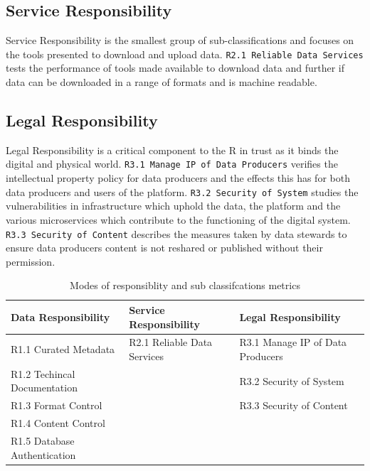 \documentclass{article}
\begin{document}
\hypertarget{service-responsibility}{%
\subsection{Service Responsibility}\label{service-responsibility}}

Service Responsibility is the smallest group of sub-classifications and
focuses on the tools presented to download and upload data.
\texttt{R2.1\ Reliable\ Data\ Services} tests the performance of tools
made available to download data and further if data can be downloaded in
a range of formats and is machine readable.

\hypertarget{legal-responsibility}{%
\subsection{Legal Responsibility}\label{legal-responsibility}}

Legal Responsibility is a critical component to the R in trust as it
binds the digital and physical world.
\texttt{R3.1\ Manage\ IP\ of\ Data\ Producers} verifies the intellectual
property policy for data producers and the effects this has for both
data producers and users of the platform.
\texttt{R3.2\ Security\ of\ System} studies the vulnerabilities in
infrastructure which uphold the data, the platform and the various
microservices which contribute to the functioning of the digital system.
\texttt{R3.3\ Security\ of\ Content} describes the measures taken by
data stewards to ensure data producers content is not reshared or
published without their permission.

\begin{table}[H]

\caption{\label{tab:fig1}Modes of responsiblity and sub classifcations metrics}
\centering
\begin{tabular}[t]{l|l|l}
\hline
Data Responsibility & Service Responsibility & Legal Responsibility\\
\hline
R1.1 Curated Metadata & R2.1 Reliable Data Services & R3.1 Manage IP of Data Producers\\
\hline
R1.2 Techincal Documentation &  & R3.2 Security of System\\
\hline
R1.3 Format Control &  & R3.3 Security of Content\\
\hline
R1.4 Content Control &  & \\
\hline
R1.5  Database Authentication &  & \\
\hline
\end{tabular}
\end{table}
\end{document}

